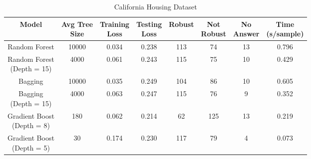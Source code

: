 \documentclass[pageno]{jpaper}
\begin{document}
\begin{doublespacing}
\begin{table}[p]
\centering
\begin{tabular}{| c | c c c c c c c |} 
 \hline
 Model & \makecell{Avg Tree \\ Size} & \makecell{Training \\ Loss} & \makecell{Testing \\ Loss} & Robust & \makecell{Not \\ Robust} & \makecell{No \\ Answer} & \makecell{Time  \\ (s/sample)} \\ [0.5ex] 
 \hline\hline
Random Forest 					& 10000 & 0.034 & 0.238 & 113 & 74 & 13 & 0.796 \\ \hline
\makecell{Random Forest \\ (Depth = 15)} & 4000 & 0.061 & 0.243 & 115 & 75 & 10 & 0.429 \\ \hline
Bagging 						& 10000 & 0.035 & 0.249 & 104 & 86 & 10 & 0.605 \\ \hline
\makecell{Bagging \\ (Depth = 15)}		& 4000 & 0.063 & 0.247 & 115 & 76 & 9 & 0.352 \\ \hline
\makecell{Gradient Boost \\ (Depth = 8)}	& 180 & 0.062 & 0.214 & 62 & 125 & 13 & 0.219 \\ \hline
\makecell{Gradient Boost \\ (Depth = 5)} 	& 30 & 0.174 & 0.230 & 117 & 79 & 4 & 0.073 \\ [1ex] 
 \hline
\end{tabular}
\caption{California Housing Dataset}
\label{table:california}
\end{table}


\end{doublespacing}
\end{document}
